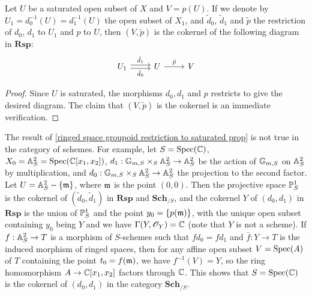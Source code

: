 \begin{lemma}\label{ringed space groupoid restriction to saturated prop}
Let $U$ be a saturated open subset of $X$ and $V=p(U)$. If we denote by $U_1=d_0^{-1}(U)=d_1^{-1}(U)$ the open subset of $X_1$, and $\tilde{d}_0$, $\tilde{d}_1$ and $\tilde{p}$ the restriction of $d_0$, $d_1$ to $U_1$ and $p$ to $U$, then $(V,\tilde{p})$ is the cokernel of the following diagram in $\mathbf{Rsp}$:
\[\begin{tikzcd}
U_1\ar[r,shift left=2pt,"\tilde{d}_1"]\ar[r,shift right=2pt,swap,"\tilde{d}_0"]&U\ar[r,"\tilde{p}"]&V
\end{tikzcd}\]
\end{lemma}
\begin{proof}
Since $U$ is saturated, the morphisms $d_0,d_1$ and $p$ restricts to give the desired diagram. The claim that $(V,\tilde{p})$ is the cokernel is an immediate verification.
\end{proof}

\begin{remark}
The result of \cref{ringed space groupoid restriction to saturated prop} is not true in the category of schemes. For example, let $S=\Spec(\C)$, $X_0=\A_S^2=\Spec(\C[x_1,x_2])$, $d_1:\G_{m,S}\times_S\A_S^2\to\A_S^2$ be the action of $\G_{m,S}$ on $\A_S^2$ by multiplication, and $d_0:\G_{m,S}\times_S\A_S^2\to\A_S^2$ the projection to the second factor. Let $U=\A_S^2-\{\m\}$, where $\m$ is the point $(0,0)$. Then the projective space $\P_S^1$ is the cokernel of $(\tilde{d}_0,\tilde{d}_1)$ in $\mathbf{Rsp}$ and $\mathbf{Sch}_{/S}$, and the cokernel $Y$ of $(d_0,d_1)$ in $\mathbf{Rsp}$ is the union of $\P^1_S$ and the point $y_0=\{p(\m)\}$, with the unique open subset containing $y_0$ being $Y$ and we have $\Gamma(Y,\mathscr{O}_Y)=\C$ (note that $Y$ is not a scheme). If $f:\A_S^2\to T$ is a morphism of $S$-schemes such that $fd_0=fd_1$ and $\bar{f}:Y\to T$ is the induced morphism of ringed spaces, then for any affine open subset $V=\Spec(A)$ of $T$ containing the point $t_0=f(\m)$, we have $f^{-1}(V)=Y$, so the ring homomorphism $A\to\C[x_1,x_2]$ factors through $\C$. This shows that $S=\Spec(\C)$ is the cokernel of $(d_0,d_1)$ in the category $\mathbf{Sch}_{/S}$.
\end{remark}

